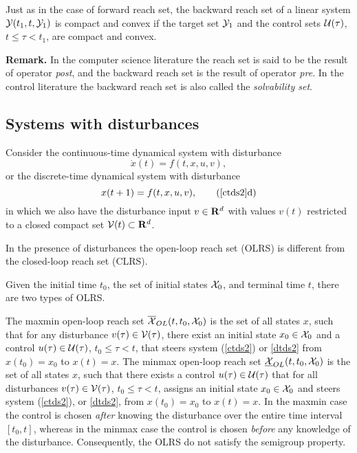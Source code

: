 Just as in the case of forward reach set, the backward reach set of
a linear system $\YY(t_1, t, \YY_1)$ is compact and convex if the target set $\YY_1$ and the control sets
$\UU(\tau)$, $t\leq\tau<t_1$, are compact and convex.

{\bf Remark.}
In the computer science literature the reach set is said to be the result
of operator \emph{post}, and the backward reach set is the result of
operator \emph{pre}.
In the control literature the backward reach set is also called the
\emph{solvability set}.


\subsection{Systems with disturbances}\label{subsec_sysdist}
Consider the continuous-time dynamical system with disturbance
\begin{equation}
\dot{x}(t) = f(t, x, u, v),
\label{ctds2}
\end{equation}
or the discrete-time dynamical system with disturbance
\begin{equation}
x(t+1) = f(t, x, u, v),
\tag*{(\ref{ctds2}d)}
\label{dtds2}
\end{equation}
in which
we also have the disturbance input $v\in{\bf R}^d$ with values $v(t)$  restricted
to a closed compact set $\VV(t)\subset{\bf R}^d$.

In the presence of disturbances the open-loop reach set (OLRS) is different from the
closed-loop reach set (CLRS).

Given the initial time $t_0$, the set of initial states $\XX_0$, and
terminal time $t$, there are two types of OLRS.

The maxmin open-loop reach set $\OXOL(t, t_0, \XX_0)$ is the set of all states $x$,
such that for any disturbance $v(\tau)\in\VV(\tau)$, there exist an initial state
$x_0\in\XX_0$ and a control $u(\tau)\in\UU(\tau)$, $t_0\leq\tau<t$, that
steers system (\ref{ctds2}) or \ref{dtds2} from $x(t_0)=x_0$ to $x(t)=x$.
\label{def_maxminolrs}
\ed
{}
The minmax open-loop reach set $\UXOL(t, t_0, \XX_0)$ is the set of all states $x$,
such that there exists a control $u(\tau)\in\UU(\tau)$ that for all disturbances
$v(\tau)\in\VV(\tau)$, $t_0\leq\tau<t$, assigns an initial state $x_0\in\XX_0$
and steers system (\ref{ctds2}), or \ref{dtds2}, from $x(t_0)=x_0$ to $x(t)=x$.
\label{def_minmaxolrs}
\ed
In the maxmin case the control is chosen \emph{after} knowing the disturbance
over the entire time interval $[t_0, t]$, whereas in the minmax case
the control is chosen \emph{before} any knowledge
of the disturbance.   Consequently, the OLRS do not satisfy the semigroup property.

